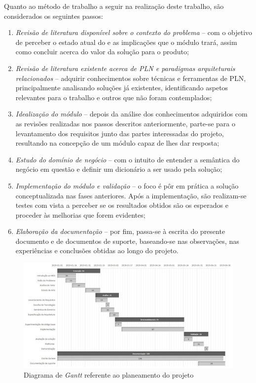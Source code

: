 Quanto ao método de trabalho a seguir na realização deste trabalho, são considerados os seguintes passos:

\begin{enumerate}
    \item 
    {
        \textit{Revisão de literatura disponível sobre o contexto do problema} -- com o objetivo de perceber o estado atual do {\productname} e as implicações que o módulo trará, assim como concluir acerca do valor da solução para o produto;
    }
    \item
    {
        \textit{Revisão de literatura existente acerca de \gls{PLN} e paradigmas arquiteturais relacionados} -- adquirir conhecimentos sobre técnicas e ferramentas de \gls{PLN}, principalmente analisando soluções já existentes, identificando aspetos relevantes para o trabalho e outros que não foram contemplados;
    }
    \item
    {
        \textit{Idealização do módulo} -- depois da análise dos conhecimentos adquiridos com as revisões realizadas nos passos descritos anteriormente, parte-se para o levantamento dos requisitos junto das partes interessadas do projeto, resultando na concepção de um módulo capaz de lhes dar resposta; 
    }
    \item
    {
        \textit{Estudo do domínio de negócio} -- com o intuito de entender a semântica do negócio em questão e definir um dicionário a ser usado pela solução;
    }
    \item
    {
        \textit{Implementação do módulo e validação} -- o foco é pôr em prática a solução conceptualizada nas fases anteriores. Após a implementação, são realizam-se testes com vista a perceber se os resultados obtidos são os esperados e proceder às melhorias que forem evidentes;
    }
    \item
    {
        \textit{Elaboração da documentação} --  por fim, passa-se à escrita do presente documento e de documentos de suporte, baseando-se nas observações, nas experiências e conclusões obtidas ao longo do projeto.
    }
\end{enumerate}

\clearpage
\begin{figure}
    \centering
    \includegraphics[width=1.0\textwidth]{pre-thesis/assets/gantt.jpg}
    \caption{Diagrama de \textit{Gantt} referente ao planeamento do projeto}
    \label{fig:planning-gantt_chart}
\end{figure}
\clearpage
